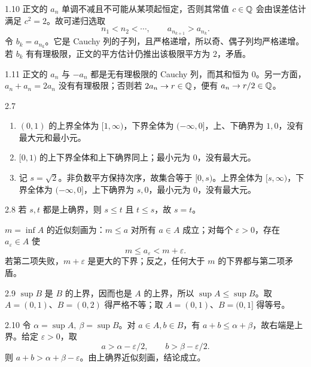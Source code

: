 \begin{solution}{1.10}
正文的 \(a_n\) 单调不减且不可能从某项起恒定，否则其常值 \(c\in\mathbb{Q}\) 会由误差估计满足 \(c^2=2\)。故可递归选取
\[
 n_1<n_2<\cdots,\qquad a_{n_{k+1}}>a_{n_k}.
\]
令 \(b_k=a_{n_k}\)。它是 Cauchy 列的子列，且严格递增，所以奇、偶子列均严格递增。若 \(b_k\) 有有理极限，正文的平方估计仍推出该极限平方为 \(2\)，矛盾。
\end{solution}

\begin{solution}{1.11}
正文的 \(a_n\) 与 \(-a_n\) 都是无有理极限的 Cauchy 列，而其和恒为 \(0\)。另一方面，\(a_n+a_n=2a_n\) 没有有理极限；否则若 \(2a_n\to r\in\mathbb{Q}\)，便有 \(a_n\to r/2\in\mathbb{Q}\)。
\end{solution}

\begin{solution}{2.7}
\begin{enumerate}[label=(\arabic*)]
 \item \((0,1)\) 的上界全体为 \([1,\infty)\)，下界全体为 \((-\infty,0]\)，上、下确界为 \(1,0\)，没有最大元和最小元。
 \item \([0,1)\) 的上下界全体和上下确界同上；最小元为 \(0\)，没有最大元。
 \item 记 \(s=\sqrt2\)。非负数平方保持次序，故集合等于 \([0,s)\)。上界全体为 \([s,\infty)\)，下界全体为 \((-\infty,0]\)，上下确界为 \(s,0\)，最小元为 \(0\)，没有最大元。
\end{enumerate}
\end{solution}

\begin{solution}{2.8}
若 \(s,t\) 都是上确界，则 \(s\le t\) 且 \(t\le s\)，故 \(s=t\)。

\(m=\inf A\) 的近似刻画为：\(m\le a\) 对所有 \(a\in A\) 成立；对每个 \(\varepsilon>0\)，存在 \(a_\varepsilon\in A\) 使
\[
 m\le a_\varepsilon<m+\varepsilon.
\]
若第二项失败，\(m+\varepsilon\) 是更大的下界；反之，任何大于 \(m\) 的下界都与第二项矛盾。
\end{solution}

\begin{solution}{2.9}
\(\sup B\) 是 \(B\) 的上界，因而也是 \(A\) 的上界，所以 \(\sup A\le\sup B\)。取 \(A=(0,1)\)、\(B=(0,2)\) 得严格不等；取 \(A=(0,1)\)、\(B=(0,1]\) 得等号。
\end{solution}

\begin{solution}{2.10}
令 \(\alpha=\sup A,\ \beta=\sup B\)。对 \(a\in A,b\in B\)，有 \(a+b\le\alpha+\beta\)，故右端是上界。给定 \(\varepsilon>0\)，取
\[
 a>\alpha-\varepsilon/2,\qquad b>\beta-\varepsilon/2.
\]
则 \(a+b>\alpha+\beta-\varepsilon\)。由上确界近似刻画，结论成立。
\end{solution}

